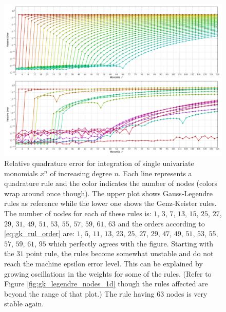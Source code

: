 \documentclass[a4paper,10pt]{article}
\begin{document}
\begin{figure}
  \centering
  \includegraphics[width=\linewidth]{./img/monomial_errors_legendre.pdf}
  \caption{Relative quadrature error for integration of single univariate monomials $x^n$ of increasing degree $n$.
  Each line represents a quadrature rule and the color indicates the number of nodes (colors wrap around once though).
  The upper plot shows Gauss-Legendre rules as reference while the lower one shows the Genz-Keister rules.
  The number of nodes for each of these rules is:
  $1$, $3$,  $7$, $13$, $15$, $25$, $27$, $29$, $31$, $49$, $51$, $53$, $55$, $57$, $59$, $61$, $63$
  and the orders according to \eqref{eq:gk_rul_order} are:
  $1$, $5$, $11$, $13$, $23$, $25$, $27$, $29$, $47$, $49$, $51$, $53$, $55$, $57$, $59$, $61$, $95$
  which perfectly agrees with the figure.
  Starting with the $31$ point rule, the rules become somewhat unstable
  and do not reach the machine epsilon error level. This can be explained
  by growing oscillations in the weights for some of the rules. (Refer to Figure
  \ref{fig:gk_legendre_nodes_1d} though the rules affected are beyond the range
  of that plot.) The rule having $63$ nodes is very stable again.}
  \label{fig:monomial_errors_legendre}
\end{figure}
\end{document}
